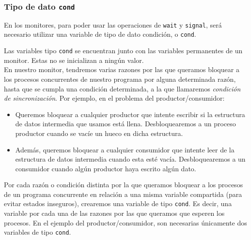\subsubsection{Tipo de dato \texttt{cond}}
En los monitores, para poder usar las operaciones de \verb|wait| y \verb|signal|, será necesario utilizar una variable de tipo de dato condición, o \verb|cond|. 

Las variables tipo \verb|cond| se encuentran junto con las variables permanentes de un monitor. Estas no se inicializan a ningún valor.\\

En nuestro monitor, tendremos varias razones por las que queramos bloquear a los procesos concurrentes de nuestro programa por alguna determinada razón, hasta que se cumpla una condición determinada, a la que llamaremos \textit{condición de sincronización}. Por ejemplo, en el problema del productor/consumidor:
\begin{itemize}
    \item Queremos bloquear a cualquier productor que intente escribir si la estructura de datos intermedia que usamos está llena. Desbloquearemos a un proceso productor cuando se vacíe un hueco en dicha estructura.
    \item Además, queremos bloquear a cualquier consumidor que intente leer de la estructura de datos intermedia cuando esta esté vacía. Desbloquearemos a un consumidor cuando algún productor haya escrito algún dato.
\end{itemize}
Por cada razón o condición distinta por la que queramos bloquear a los procesos de un programa concurrente en relación a una misma variable compartida (para evitar estados inseguros), crearemos una variable de tipo \verb|cond|. Es decir, una variable por cada una de las razones por las que queramos que esperen los procesos. En el ejemplo del productor/consumidor, son necesarias únicamente dos variables de tipo \verb|cond|.\\


